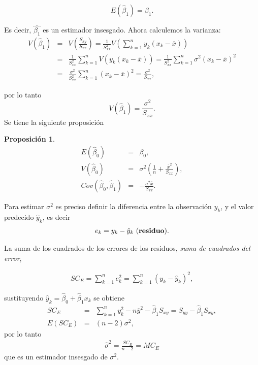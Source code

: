 \documentclass[12pt]{article}
\newtheorem{Prop}{Proposici\'on}%
\begin{document}
\begin{equation}\label{Esperanza.Beta.1}
E\left(\hat{\beta}_{1}\right)=\beta_{1}.
\end{equation}

Es decir, $\hat{\beta_{1}}$ es un estimador insesgado. Ahora calculemos la varianza:
\begin{eqnarray*}
V\left(\hat{\beta}_{1}\right)&=&V\left(\frac{S_{xy}}{S_{xx}}\right)=\frac{1}{S_{xx}^{2}}V\left(\sum_{k=1}^{n}y_{k}\left(x_{k}-\overline{x}\right)\right)\\
&=&\frac{1}{S_{xx}^{2}}\sum_{k=1}^{n}V\left(y_{k}\left(x_{k}-\overline{x}\right)\right)=\frac{1}{S_{xx}^{2}}\sum_{k=1}^{n}\sigma^{2}\left(x_{k}-\overline{x}\right)^{2}\\
&=&\frac{\sigma^{2}}{S_{xx}^{2}}\sum_{k=1}^{n}\left(x_{k}-\overline{x}\right)^{2}=\frac{\sigma^{2}}{S_{xx}},
\end{eqnarray*}

por lo tanto
\begin{equation}\label{Varianza.Beta.1}
V\left(\hat{\beta}_{1}\right)=\frac{\sigma^{2}}{S_{xx}}.
\end{equation}
Se tiene la siguiente proposici\'on

\begin{Prop}
\begin{eqnarray}
E\left(\hat{\beta}_{0}\right)&=&\beta_{0},\\
V\left(\hat{\beta}_{0}\right)&=&\sigma^{2}\left(\frac{1}{n}+\frac{\overline{x}^{2}}{S_{xx}}\right),\\
Cov\left(\hat{\beta}_{0},\hat{\beta}_{1}\right)&=&-\frac{\sigma^{2}\overline{x}}{S_{xx}}.
\end{eqnarray}
\end{Prop}

Para estimar $\sigma^{2}$ es preciso definir la diferencia entre la observaci\'on $y_{k}$, y el valor predecido $\hat{y}_{k}$, es decir
\begin{eqnarray*}
e_{k}=y_{k}-\hat{y}_{k}\textrm{ (\textbf{residuo}).}
\end{eqnarray*}

La suma de los cuadrados de los errores de los residuos, \textit{suma de cuadrados del error},

\begin{eqnarray*}
SC_{E}=\sum_{k=1}^{n}e_{k}^{2}=\sum_{k=1}^{n}\left(y_{k}-\hat{y}_{k}\right)^{2},
\end{eqnarray*}

sustituyendo $\hat{y}_{k}=\hat{\beta}_{0}+\hat{\beta}_{1}x_{k}$ se obtiene
\begin{eqnarray*}
SC_{E}&=&\sum_{k=1}^{n}y_{k}^{2}-n\overline{y}^{2}-\hat{\beta}_{1}S_{xy}=S_{yy}-\hat{\beta}_{1}S_{xy},\\
E\left(SC_{E}\right)&=&\left(n-2\right)\sigma^{2},
\end{eqnarray*}
por lo tanto
\begin{eqnarray*}
\hat{\sigma}^{2}=\frac{SC_{E}}{n-2}=MC_{E}
\end{eqnarray*}
que es un estimador insesgado de $\sigma^{2}$.
\end{document}
